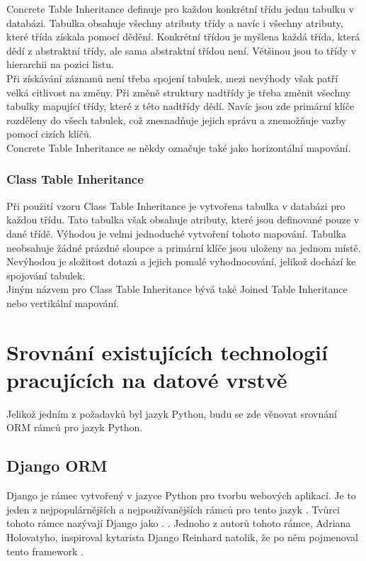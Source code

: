 \documentclass[ing,male,java,dept456]{diploma}						%
\begin{document}
Concrete Table Inheritance definuje pro každou konkrétní třídu jednu tabulku v databázi. Tabulka obsahuje všechny atributy třídy a navíc i všechny atributy, které třída získala pomocí dědění. Konkrétní třídou je myšlena každá třída, která dědí z abstraktní třídy, ale sama abstraktní třídou není. Většinou jsou to třídy v hierarchii na pozici listu. \\
Při získávání záznamů není třeba spojení tabulek, mezi nevýhody však patří velká citlivost na změny. Při změně struktury nadtřídy je třeba změnit všechny tabulky mapující třídy, které z této nadtřídy dědí. Navíc jsou zde primární klíče rozděleny do všech tabulek, což znesnadňuje jejich správu a znemožňuje vazby pomocí cizích klíčů. \\
Concrete Table Inheritance se někdy označuje také jako horizontální mapování.

\subsubsection{Class Table Inheritance}

Při použití vzoru Class Table Inheritance je vytvořena tabulka v databázi pro každou třídu. Tato tabulka však obsahuje atributy, které jsou definované pouze v dané třídě. Výhodou je velmi jednoduché vytvoření tohoto mapování. Tabulka neobsahuje žádné prázdné sloupce a primární klíče jsou uloženy na jednom místě. Nevýhodou je složitost dotazů a jejich pomalé vyhodnocování, jelikož dochází ke spojování tabulek.  \\
Jiným názvem pro Class Table Inheritance bývá také Joined Table Inheritance nebo vertikální mapování.

\section{Srovnání existujících technologií pracujících na datové vrstvě}
\label{sec:Comparison}
Jelikož jedním z požadavků byl jazyk Python, budu se zde věnovat srovnání ORM rámců pro jazyk Python.

\subsection{Django ORM}

Django je rámec vytvořený v jazyce Python pro tvorbu webových aplikací. Je to jeden z nejpopulárnějších a nejpoužívanějších rámců pro tento jazyk \cite{pwiki}. Tvůrci tohoto rámce nazývají Django jako .  \cite{django.cz}. Jednoho z autorů tohoto rámce, Adriana Holovatyho, inspiroval kytarista Django Reinhard natolik, že po něm pojmenoval tento framework \cite{aholovaty}.  \\
\end{document}
